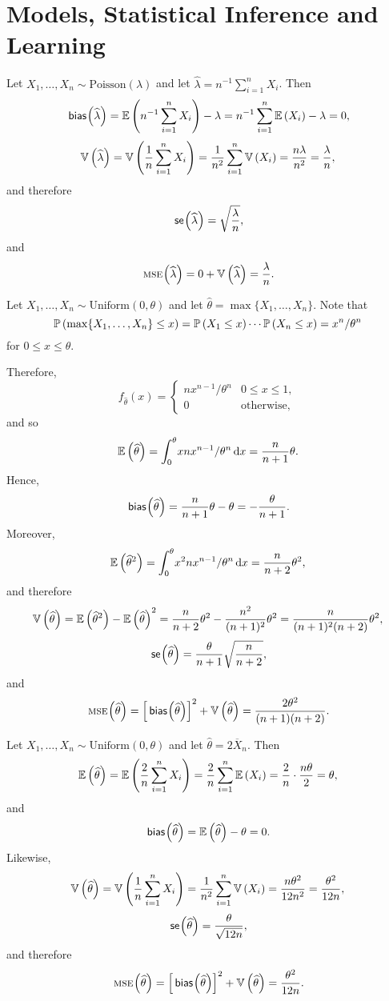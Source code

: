 \chapter{Models, Statistical Inference and Learning}

\begin{ex}
  Let $X_1,\ldots,X_n\sim\text{Poisson}(\lambda)$ and let
  $\widehat{\lambda}=n^{-1}\sum_{i=1}^nX_i$. Then
  \[
    \bias{\widehat{\lambda}}
    =\E{n^{-1}\sum_{i=1}^nX_i}-\lambda
    =n^{-1}\sum_{i=1}^n\E{X_i}-\lambda
    =0,
  \]
  \[
    \var{\widehat{\lambda}}
    =\var{\frac{1}{n}\sum_{i=1}^n X_i}
    =\frac{1}{n^2}\sum_{i=1}^n \var{X_i}
    =\frac{n\lambda}{n^2}=\frac{\lambda}{n},
  \]
  and therefore
  \[
    \se{\widehat{\lambda}}
    =\sqrt{\frac{\lambda}{n}},
  \]
  and
  \[
    \mse{\widehat{\lambda}}=
    0+\var{\widehat{\lambda}}=\frac{\lambda}{n}.
  \]
\end{ex}

\begin{ex}
  Let $X_1,\ldots,X_n\sim\text{Uniform}(0,\theta)$ and let
  $\widehat{\theta} = \max\{X_1,\ldots, X_n\}$. Note that
  \[
    \P{\max\{X_1,\ldots,X_n\}\leq x}
    =\P{X_1\leq x}\cdots\P{X_n\leq x}
    =x^n/\theta^n
  \]
  for $0\leq x\leq\theta$.

  Therefore,
  \[
    f_{\widehat{\theta}}(x)
    =\begin{cases}
      nx^{n-1}/\theta^n & 0\leq x\leq 1,    \\
      0                 & \text{otherwise},
    \end{cases}
  \]
  and so
  \[
    \E{\widehat{\theta}}
    =\int_0^\theta\!xnx^{n-1}/\theta^n\,\d{x}
    =\frac{n}{n+1}\theta.
  \]
  Hence,
  \[
    \bias{\widehat{\theta}}
    =\frac{n}{n+1}\theta-\theta=-\frac{\theta}{n+1}.
  \]
  Moreover,
  \[
    \E{\widehat{\theta}^2}
    =\int_0^\theta\!x^2nx^{n-1}/\theta^n\,\d{x}
    =\frac{n}{n+2}\theta^2,
  \]
  and therefore
  \[
    \var{\widehat{\theta}}
    =\E{\widehat{\theta}^2}
    -\E{\widehat{\theta}}^2
    =\frac{n}{n+2}\theta^2
    -\frac{n^2}{(n+1)^2}\theta^2
    =\frac{n}{(n+1)^2(n+2)}\theta^2,
  \]
  \[
    \se{\widehat{\theta}}
    =\frac{\theta}{n+1}\sqrt{\frac{n}{n+2}},
  \]
  and
  \[
    \mse{\widehat{\theta}}
    =\left[\bias{\widehat{\theta}}\right]^2+\var{\widehat{\theta}}
    =\frac{2\theta^2}{(n+1)(n+2)}.
  \]
\end{ex}

\begin{ex}
  Let $X_1,\ldots,X_n\sim\text{Uniform}(0,\theta)$ and let
  $\widehat{\theta} = 2\overline{X}_n$. Then
  \[
    \E{\widehat{\theta}}
    =\E{\frac{2}{n}\sum_{i=1}^n X_i}
    =\frac{2}{n}\sum_{i=1}^n \E{X_i}
    =\frac{2}{n}\cdot \frac{n\theta}{2}=\theta,
  \]
  and
  \[
    \bias{\widehat{\theta}}
    =\E{\widehat{\theta}}-\theta
    =0.
  \]
  Likewise,
  \[
    \var{\widehat{\theta}}
    =\var{\frac{1}{n}\sum_{i=1}^n X_i}
    =\frac{1}{n^2}\sum_{i=1}^n \var{X_i}
    =\frac{n\theta^2}{12n^2}
    =\frac{\theta^2}{12n},
  \]
  \[
    \se{\widehat{\theta}}
    =\frac{\theta}{\sqrt{12 n}},
  \]
  and therefore
  \[
    \mse{\widehat{\theta}}
    =\left[\bias{\widehat{\theta}}\right]^2+\var{\widehat{\theta}}
    =\frac{\theta^2}{12n}.
  \]
\end{ex}